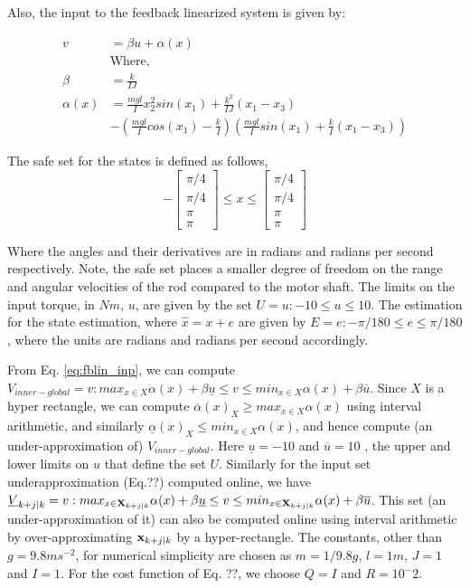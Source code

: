 Also, the input to the feedback linearized system is given by:

\begin{subequations}
\label{eq:fblin_inp}
\begin{align}
v&=\beta u+ \alpha(x) \\
&\text{Where,} \nonumber \\
\beta&=\frac{k}{IJ} \\
\alpha(x)&=\frac{mgl}{I}x_2^2sin(x_1) + \frac{k^2}{IJ}(x_1-x_3) \nonumber \\
&- (\frac{mgl}{I}cos(x_1)-\frac{k}{I})(\frac{mgl}{I}sin(x_1)+\frac{k}{I}(x_1-x_3))
\end{align}
\end{subequations}

The safe set for the states is defined as follows, 
\begin{equation}
 -\begin{bmatrix} \pi/4  \\ \pi/4  \\ \pi \\ \pi \end{bmatrix} \leq x \leq \begin{bmatrix} \pi/4  \\ \pi/4  \\ \pi \\ \pi \end{bmatrix}
\end{equation}

Where the angles and their derivatives are in radians and radians per second respectively. Note, the safe set places a smaller degree of freedom on the range and angular velocities of the rod compared to the motor shaft.
The limits on the input torque, in $Nm$, $u$, are given by the set $U = u :-10 \leq u \leq 10$. The estimation for the state estimation, where $\hat{x} = x + e$ are given by $E = e:-\pi /180 \leq e \leq \pi /180 $, where the units are radians and radians per second accordingly. 

From Eq. \ref{eq:fblin_inp}, we can compute $V_{inner-global} =v: max_{x\in X}\alpha(x) + \beta \underline{u} \leq v \leq min_{x\in X}\alpha(x) + \beta \overline{u}$. Since $X$ is a hyper rectangle, we can compute $\overline{\alpha}(x)_{X} \geq  max_{x\in X}\alpha(x)$ using interval arithmetic, and similarly $\underline{\alpha}(x)_{X} \leq  min_{x\in X}\alpha(x)$, and hence compute (an under-approximation of) $V_{inner-global}$. Here $\underline{u}=-10$ and $\overline{u}=10$ , the upper and lower limits on $u$ that define the set $U$.
Similarly for the input set underapproximation (Eq.??) computed online, we have $\underline{V}_{k+j|k} = v:   max_{x\in \mathbf{X}_{k+j|k}} \alpha(x) + \beta \underline{u} \leq v \leq  min_{x\in \mathbf{X}_{k+j|k}}\alpha(x) + \beta \overline{u}$. This set (an under-approximation of it) can also be computed online using interval arithmetic by over-approximating $\mathbf{x}_{k+j|k}$ by a hyper-rectangle. The constants, other than $g=9.8ms^{-2}$, for numerical simplicity are chosen as $m=1/9.8g$, $l=1m$, $J=1$ and $I=1$. For the cost function of Eq. ??, we choose $Q=I$ and $R=10^-2$.

